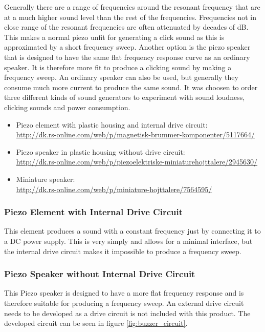 Generally there are a range of frequencies around the resonant frequency that are at a much higher sound level than the rest of the frequencies.
Frequencies not in close range of the resonant frequencies are often attenuated by decades of dB.
This makes a normal piezo unfit for generating a click sound as this is approximated by a short frequency sweep.
Another option is the piezo speaker that is designed to have the same flat frequency response curve as an ordinary speaker.
It is therefore more fit to produce a clicking sound by making a frequency sweep.
An ordinary speaker can also be used, but generally they consume much more current to produce the same sound.
It was choosen to order three different kinds of sound generators to experiment with sound loudness, clicking sounds and power consumption.
\begin{itemize}
  \item Piezo element with plastic housing and internal drive circuit:\\
        \url{http://dk.rs-online.com/web/p/magnetisk-brummer-komponenter/5117664/}
  \item Piezo speaker in plastic housing without drive circuit: \\
        \url{http://dk.rs-online.com/web/p/piezoelektriske-miniaturehojttalere/2945630/}
  \item Miniature speaker:\\
          \url{http://dk.rs-online.com/web/p/miniature-hojttalere/7564595/}
\end{itemize}
\subsubsection*{Piezo Element with Internal Drive Circuit}
This element produces a sound with a constant frequency just by connecting it to a DC power supply. 
This is very simply and allows for a minimal interface, but the internal drive circuit makes it impossible to produce a frequency sweep. 

\subsubsection*{Piezo Speaker without Internal Drive Circuit}
This Piezo speaker is designed to have a more flat frequency response and is therefore suitable for producing a frequency sweep. 
An external drive circuit needs to be developed as a drive circuit is not included with this product.
The developed circuit can be seen in figure \ref{fig:buzzer_circuit}.

